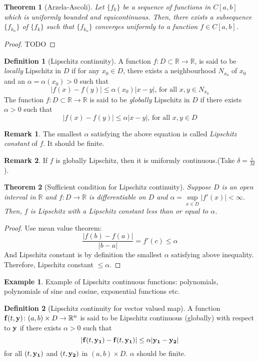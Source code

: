 \documentclass[12pt,reqno]{amsart}
\theoremstyle{plain}
\newtheorem{thm}{Theorem}
\theoremstyle{definition}
\newtheorem{defn}{Definition}
\newtheorem{eg}{Example}
\newtheorem{rem}{Remark}
\begin{document}
\begin{thm}[Arzela-Ascoli]
    Let $\{f_k\}$ be a sequence of functions in $C[a,b]$ which is uniformly bounded and equicontinuous. Then, there exists a subsequence $\{f_{k_n}\}$ of $\{f_k\}$ such that $\{f_{k_n}\}$ converges uniformly to a function $f \in  C[a,b]$.
\end{thm}
\begin{proof}
  TODO
\end{proof}
\begin{defn}[Lipschitz continuity]
    A function $f \colon D \subset \mathbb{R} \to \mathbb{R}$, is said to be {\it locally} Lipschitz in $D$ if for any $x_0 \in D$, there exists a neighbourhood $N_{x_0}$ of $x_0$ and an $\alpha = \alpha(x_0) > 0$ such that 
    $$ |f(x) - f(y)| \leq \alpha(x_0)|x - y|\text{, for all } x,y 
    \in N_{x_0}$$
    The function $f \colon D \subset 
    \mathbb{R} \to \mathbb{R}$ is said to be {\it globally} Lipschitz in $D$ if there exists $\alpha > 0$ such that 
    $$|f(x) - f(y)| \leq \alpha|x - y|\text{, for all } x,y 
    \in D$$       
\end{defn}
\begin{rem}
    The smallest $\alpha$ satisfying the above equation is called {\it Lipschitz constant} of $f$. It should be finite.
\end{rem}
\begin{rem}
    If $f$ is globally Lipschitz, then it is uniformly continuous.(Take $\delta = \frac{\varepsilon}{M}$).
\end{rem}
\begin{thm}[Sufficient condition for Lipschitz continuity]
    Suppose $D$ is an open interval in $\mathbb{R}$ and $f \colon D \to \mathbb{R}$ is differentiable on $D$ and $\alpha = \sup\limits_{x \in D}|f'(x)| < \infty$. Then, $f$ is Lipschitz with a Lipschitz constant less than or equal to $\alpha$.
\end{thm}
\begin{proof}
    Use mean value theorem: 
    $$ \frac{|f(b) - f(a)|}{|b - a|} = f'(c) \leq \alpha$$
    And Lipschitz constant is by definition the smallest $\alpha$ satisfying above inequality. Therefore, Lipschitz constant $\leq \alpha$.
\end{proof}
\begin{eg}
    Example of Lipschitz continuous functions: polynomials, polynomials of sine and cosine, exponential functions etc.
\end{eg}
\begin{defn}[Lipschitz continuity for vector valued map]
    A function ${\bf f}(t,{\bf y}) \colon (a,b) \times D \to \mathbb{R}^n$ is said to be Lipschitz continuous (globally) with respect to ${\bf y}$ if there exists $\alpha > 0$ such that
    $$ |{\bf f}(t, {\bf y_1}) - {\bf f}(t, {\bf y_1})| \leq \alpha|{\bf y_1 - y_2}|$$
    for all $(t, {\bf y_1})$ and $(t, {\bf y_2})$ in $(a,b) \times D$. $\alpha$ should be finite.
\end{defn}
\end{document}
